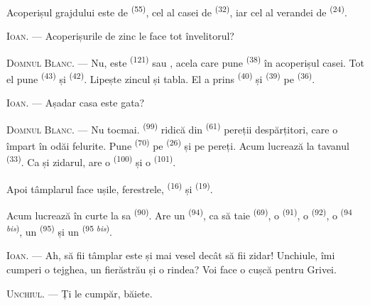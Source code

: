 Acoperișul grajdului este de  \textsuperscript{(55)}, cel al casei
de  \textsuperscript{(32)}, iar cel al verandei de 
\textsuperscript{(24)}.

\textsc{Ioan}. --- Acoperișurile de zinc le face tot învelitorul?

\textsc{Domnul Blanc}. --- Nu, este  \textsuperscript{(121)}
sau , acela care pune 
\textsuperscript{(38)} în acoperișul casei. Tot el pune 
\textsuperscript{(43)} și  \textsuperscript{(42)}. Lipește
zincul și tabla. El a prins  \textsuperscript{(40)} și
 \textsuperscript{(39)} pe 
\textsuperscript{(36)}.

\textsc{Ioan}. --- Așadar casa este gata?

\VUsaut{3.0mm}
\VUsaut{3.0mm}

\textsc{Domnul Blanc}. --- Nu tocmai.  \textsuperscript{(99)}
ridică din  \textsuperscript{(61)} pereții despărțitori, care o
împart în odăi felurite. Pune  \textsuperscript{(70)} pe
 \textsuperscript{(26)} și pe pereți. Acum lucrează la tavanul
 \textsuperscript{(33)}. Ca și zidarul, are o 
\textsuperscript{(100)} și o  \textsuperscript{(101)}.

Apoi tâmplarul face ușile, ferestrele, 
\textsuperscript{(16)} și  \textsuperscript{(19)}.

Acum lucrează în curte la  sa \textsuperscript{(90)}. Are un
 \textsuperscript{(94)}, ca să taie 
\textsuperscript{(69)}, o  \textsuperscript{(91)}, o
 \textsuperscript{(92)}, o  \textsuperscript{(94
\textit{bis})}, un  \textsuperscript{(95)} și un  \textsuperscript{(95 \textit{bis})}.

\textsc{Ioan}. --- Ah, să fii tâmplar este și mai vesel decât să fii zidar!
Unchiule, îmi cumperi o tejghea, un fierăstrău și o rindea? Voi face o cușcă
pentru Grivei.

\textsc{Unchiul}. --- Ți le cumpăr, băiete.


